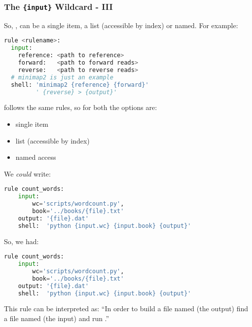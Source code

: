 \begin{frame}[fragile]
  \frametitle{The  \texttt{\{input\}} Wildcard - III}
  So, , can be a single item, a list (accessible by index) or named. For example:
  \begin{lstlisting}[language=Python,style=Python]
rule <rulename>:
  input:
    reference: <path to reference>
    forward:   <path to forward reads>
    reverse:   <path to reverse reads>
  # minimap2 is just an example
  shell: 'minimap2 {reference} {forward}' 
         ' {reverse} > {output}'
  \end{lstlisting}
  \pause
   follows the same rules, so for both the options are:
  \begin{itemize}
   \item single item
   \item list (accessible by index)
   \item named access
  \end{itemize}
\end{frame}

\begin{frame}[fragile]
  We \emph{could} write:
  \begin{lstlisting}[language=Python,style=Python]
rule count_words:
    input:
        wc='scripts/wordcount.py',
        book='../books/{file}.txt'
    output: '{file}.dat'
    shell:  'python {input.wc} {input.book} {output}'
  \end{lstlisting}
\end{frame}

\begin{frame}[fragile]
  So, we had:
    \begin{lstlisting}[language=Python,style=Python]
  rule count_words:
    input:
        wc='scripts/wordcount.py',
        book='../books/{file}.txt'
    output: '{file}.dat'
    shell:  'python {input.wc} {input.book} {output}'   
    \end{lstlisting}
    \begin{block}{This rule can be interpreted as:}
``In order to build a file named  (the output) find a file named  (the input) and run .''
  \end{block}
\end{frame}

